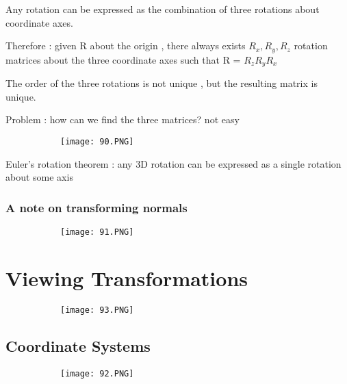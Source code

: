 \documentclass{article}
\begin{document}
Any rotation can be expressed as the combination of three rotations about coordinate axes.

Therefore : given R about the origin , there always exists $R_x,R_y,R_z$ rotation matrices about the three coordinate axes such that R = $R_z R_y R_x$

The order of the three rotations is not unique , but the resulting matrix is unique.

Problem : how can we find the three matrices? not easy

\begin{figure}[ht!]
  \centering
  \begin{subfigure}[b]{0.4\linewidth}
    \texttt{[image: 90.PNG]}
  \end{subfigure}
\end{figure}

Euler's rotation theorem : any 3D rotation can be expressed as a single rotation about some axis


\subsubsection{A note on transforming normals}

\begin{figure}[ht!]
  \centering
  \begin{subfigure}[b]{0.6\linewidth}
    \texttt{[image: 91.PNG]}
  \end{subfigure}
\end{figure}



\section{Viewing Transformations}


\begin{figure}[ht!]
  \centering
  \begin{subfigure}[b]{0.5\linewidth}
    \texttt{[image: 93.PNG]}
  \end{subfigure}
\end{figure}

\vspace{20mm}
\subsection{Coordinate Systems}

\begin{figure}[ht!]
  \centering
  \begin{subfigure}[b]{0.5\linewidth}
    \texttt{[image: 92.PNG]}
  \end{subfigure}
\end{figure}
\end{document}
